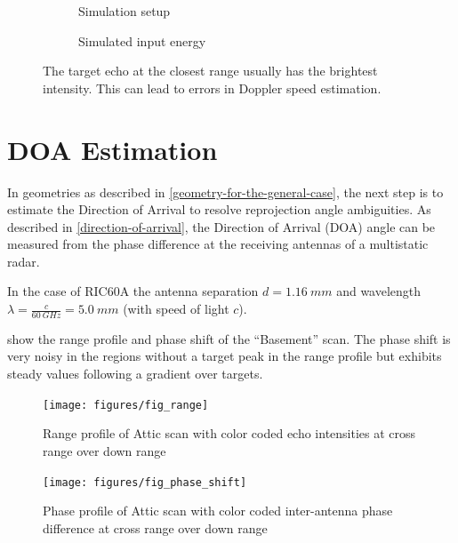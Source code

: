 \begin{figure}[htbp]
    \centering
    \begin{subfigure}[t]{.5\textwidth}
        \centering
        \def\svgscale{.8}
        
        \caption{Simulation setup}
        \label{fig:squiggly_doppler_at_wall_1}
    \end{subfigure}%
    \hfill%
    \begin{subfigure}[t]{.5\textwidth}
        \centering
        \def\svgscale{.8}
        
        \caption{Simulated input energy}
        \label{fig:squiggly_doppler_at_wall_2}
    \end{subfigure}\bigskip
    \caption{The target echo at the closest range usually has the brightest intensity. This can lead to errors in Doppler speed estimation.}
    \label{fig:squiggly_doppler_at_wall}
\end{figure}

\section{DOA Estimation}\label{doa-implementation}

In geometries as described in \cref{geometry-for-the-general-case}, the next step is to estimate the Direction of Arrival to resolve reprojection angle ambiguities.
As described in \cref{direction-of-arrival}, the Direction of Arrival (DOA) angle can be measured from the phase difference at the receiving antennas of a multistatic radar.

In the case of RIC60A the antenna separation \(d=\SI{1.16}{mm}\) and
wavelength \(\lambda=\frac{c}{\SI{60}{GHz}}=\SI{5.0}{mm}\) (with speed
of light \(c\)).

 show the range profile and phase shift of the
``Basement'' scan. The phase shift is very noisy in the regions without
a target peak in the range profile but exhibits steady values following
a gradient over targets.

\begin{figure}[htbp]
    \centering
    \texttt{[image: figures/fig\_range]}
    \caption{Range profile of Attic scan with color coded echo intensities at cross range over down range}
    \label{fig:fig_range}
\end{figure}

\begin{figure}[htbp]
    \centering
    \texttt{[image: figures/fig\_phase\_shift]}
    \caption{Phase profile of Attic scan with color coded inter-antenna phase difference at cross range over down range}
    \label{fig:fig_phase_shift}
\end{figure}

